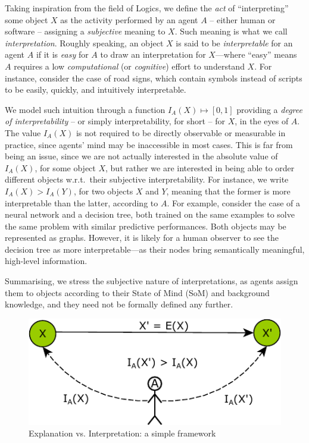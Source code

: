 \documentclass[12pt,a4paper,openright,twoside]{book}
\begin{document}
Taking inspiration from the field of Logics, we define the \emph{act} of ``interpreting'' some object $X$ as the activity performed by an agent $A$ -- either human or software -- assigning a \emph{subjective} meaning to $X$.
%
Such meaning is what we call \emph{interpretation}.
%
Roughly speaking, an object $X$ is said to be  \emph{interpretable} for an agent $A$ if it is \emph{easy} for $A$ to draw an interpretation for $X$---where ``easy'' means $A$ requires a low \emph{computational} (or \emph{cognitive}) effort to understand $X$.
%
For instance, consider the case of road signs, which contain symbols instead of scripts to be easily, quickly, and intuitively interpretable.

We model such intuition through a function $I_A(X) \mapsto [0, 1]$ providing a \emph{degree of interpretability} -- or simply interpretability, for short -- for $X$, in the eyes of $A$.
%
The value $I_A(X)$ is not required to be directly observable or measurable in practice, since agents' mind may be inaccessible in most cases.
%
This is far from being an issue, since we are not actually interested in the absolute value of $I_A(X)$, for some object $X$, but rather we are interested in being able to order different objects w.r.t.\ their subjective interpretability.
%
For instance, we write $I_A(X) > I_A(Y)$, for two objects $X$ and $Y$, meaning that the former is more interpretable than the latter, according to $A$.
%
For example, consider the case of a neural network and a decision tree, both trained on the same examples to solve the same problem with similar predictive performances.
%
Both objects may be represented as graphs.
%
However, it is likely for a human observer to see the decision tree as more interpretable---as their nodes bring semantically meaningful, high-level information.

Summarising, we stress the subjective nature of interpretations, as agents assign them to objects according to their State of Mind (SoM) \cite{PremackW1978} and background knowledge, and they need not be formally defined any further.

\begin{figure}
    \centering
    \includegraphics[width=.5\linewidth]{figures/framework.pdf}
    \caption{Explanation vs. Interpretation: a simple framework}
    \label{fig:framework}
\end{figure}
\end{document}
